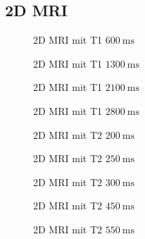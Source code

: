 \subsection{2D MRI}
    \begin{figure}[H]
        \centering
        
        \caption{2D MRI mit T1 $\SI{600}{\milli\second}$}
    \end{figure}
    \begin{figure}[H]
        \centering
        
        \caption{2D MRI mit T1 $\SI{1300}{\milli\second}$}
    \end{figure}
    \begin{figure}[H]
        \centering
        
        \caption{2D MRI mit T1 $\SI{2100}{\milli\second}$}
    \end{figure}
    \begin{figure}[H]
        \centering
        
        \caption{2D MRI mit T1 $\SI{2800}{\milli\second}$}
    \end{figure}
    \begin{figure}[H]
        \centering
        
        \caption{2D MRI mit T2 $\SI{200}{\milli\second}$}
    \end{figure}
    \begin{figure}[H]
        \centering
        
        \caption{2D MRI mit T2 $\SI{250}{\milli\second}$}
    \end{figure}
    \begin{figure}[H]
        \centering
        
        \caption{2D MRI mit T2 $\SI{300}{\milli\second}$}
    \end{figure}
    \begin{figure}[H]
        \centering
        
        \caption{2D MRI mit T2 $\SI{450}{\milli\second}$}
    \end{figure}
    \begin{figure}[H]
        \centering
        
        \caption{2D MRI mit T2 $\SI{550}{\milli\second}$}
    \end{figure}

